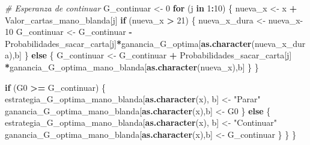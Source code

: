 \documentclass[12pt,a4paper,]{book}
\newenvironment{Shaded}{\begin{snugshade}}{\end{snugshade}}
\newcommand{\CommentTok}[1]{\textcolor[rgb]{0.56,0.35,0.01}{\textit{#1}}}
\newcommand{\ControlFlowTok}[1]{\textcolor[rgb]{0.13,0.29,0.53}{\textbf{#1}}}
\newcommand{\DecValTok}[1]{\textcolor[rgb]{0.00,0.00,0.81}{#1}}
\newcommand{\FunctionTok}[1]{\textcolor[rgb]{0.13,0.29,0.53}{\textbf{#1}}}
\newcommand{\NormalTok}[1]{#1}
\newcommand{\OtherTok}[1]{\textcolor[rgb]{0.56,0.35,0.01}{#1}}
\newcommand{\SpecialCharTok}[1]{\textcolor[rgb]{0.81,0.36,0.00}{\textbf{#1}}}
\newcommand{\StringTok}[1]{\textcolor[rgb]{0.31,0.60,0.02}{#1}}
\numberwithin{dummy}{section}
\theoremstyle{ocrenumbox}
\theoremstyle{blacknumex}
\theoremstyle{blacknumbox}
\theoremstyle{ocrenum}
\theoremstyle{ocrenum}
\begin{document}
\begin{Shaded}
\begin{Highlighting}[]
    \CommentTok{\# Esperanza de continuar}
\NormalTok{    G\_continuar }\OtherTok{\textless{}{-}} \DecValTok{0}
    \ControlFlowTok{for}\NormalTok{ (j }\ControlFlowTok{in} \DecValTok{1}\SpecialCharTok{:}\DecValTok{10}\NormalTok{) \{}
\NormalTok{      nueva\_x }\OtherTok{\textless{}{-}}\NormalTok{ x }\SpecialCharTok{+}\NormalTok{ Valor\_cartas\_mano\_blanda[j]}
      \ControlFlowTok{if}\NormalTok{ (nueva\_x }\SpecialCharTok{\textgreater{}} \DecValTok{21}\NormalTok{) \{}
\NormalTok{        nueva\_x\_dura }\OtherTok{\textless{}{-}}\NormalTok{ nueva\_x}\DecValTok{{-}10}
\NormalTok{        G\_continuar }\OtherTok{\textless{}{-}}\NormalTok{ G\_continuar }\SpecialCharTok{{-}}\NormalTok{ Probabilidades\_sacar\_carta[j]}\SpecialCharTok{*}\NormalTok{ganancia\_G\_optima[}\FunctionTok{as.character}\NormalTok{(nueva\_x\_dura),b]}
\NormalTok{      \} }\ControlFlowTok{else}\NormalTok{ \{}
\NormalTok{        G\_continuar }\OtherTok{\textless{}{-}}\NormalTok{ G\_continuar }\SpecialCharTok{+}\NormalTok{ Probabilidades\_sacar\_carta[j] }\SpecialCharTok{*}\NormalTok{ganancia\_G\_optima\_mano\_blanda[}\FunctionTok{as.character}\NormalTok{(nueva\_x),b] }
\NormalTok{      \}}
\NormalTok{    \}}
    
    \ControlFlowTok{if}\NormalTok{ (G0 }\SpecialCharTok{\textgreater{}=}\NormalTok{ G\_continuar) \{}
\NormalTok{      estrategia\_G\_optima\_mano\_blanda[}\FunctionTok{as.character}\NormalTok{(x), b] }\OtherTok{\textless{}{-}} \StringTok{"Parar"}
\NormalTok{      ganancia\_G\_optima\_mano\_blanda[}\FunctionTok{as.character}\NormalTok{(x),b] }\OtherTok{\textless{}{-}}\NormalTok{ G0}
\NormalTok{    \} }\ControlFlowTok{else}\NormalTok{ \{}
\NormalTok{      estrategia\_G\_optima\_mano\_blanda[}\FunctionTok{as.character}\NormalTok{(x), b] }\OtherTok{\textless{}{-}} \StringTok{"Continuar"}
\NormalTok{      ganancia\_G\_optima\_mano\_blanda[}\FunctionTok{as.character}\NormalTok{(x),b] }\OtherTok{\textless{}{-}}\NormalTok{ G\_continuar}
\NormalTok{    \}}
\NormalTok{  \}}
\NormalTok{\}}
\end{Highlighting}
\end{Shaded}

\begingroup\fontsize{12}{14}\selectfont
\end{document}
